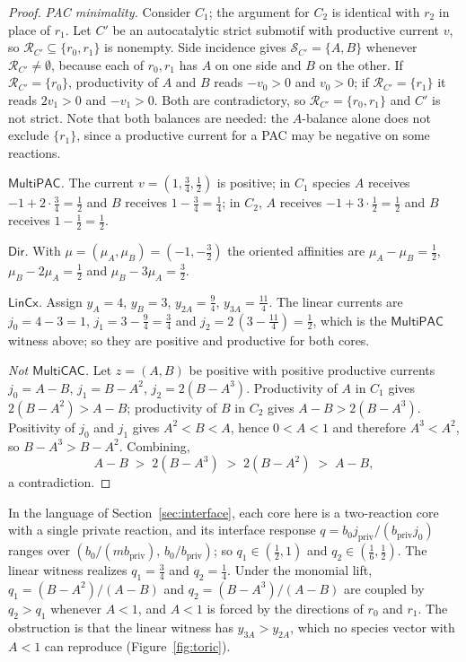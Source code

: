 \documentclass[11pt,a4paper]{article}
\theoremstyle{plain}
\theoremstyle{definition}
\theoremstyle{remark}
\newcommand{\cS}{\mathcal{S}}
\newcommand{\cR}{\mathcal{R}}
\newcommand{\MPAC}{\mathsf{MultiPAC}}
\newcommand{\MCAC}{\mathsf{MultiCAC}}
\newcommand{\DIR}{\mathsf{Dir}}
\newcommand{\LIN}{\mathsf{LinCx}}
\begin{document}
\begin{proof}
\emph{PAC minimality.} Consider $C_1$; the argument for $C_2$ is identical with $r_2$ in place of $r_1$. Let $C'$ be an autocatalytic strict submotif with productive current $v$, so $\cR_{C'}\subseteq\{r_0,r_1\}$ is nonempty. Side incidence gives $\cS_{C'}=\{A,B\}$ whenever $\cR_{C'}\neq\emptyset$, because each of $r_0,r_1$ has $A$ on one side and $B$ on the other. If $\cR_{C'}=\{r_0\}$, productivity of $A$ and $B$ reads $-v_0>0$ and $v_0>0$; if $\cR_{C'}=\{r_1\}$ it reads $2v_1>0$ and $-v_1>0$. Both are contradictory, so $\cR_{C'}=\{r_0,r_1\}$ and $C'$ is not strict. Note that both balances are needed: the $A$-balance alone does not exclude $\{r_1\}$, since a productive current for a PAC may be negative on some reactions.

\emph{$\MPAC$.} The current $v=(1,\tfrac34,\tfrac12)$ is positive; in $C_1$ species $A$ receives $-1+2\cdot\tfrac34=\tfrac12$ and $B$ receives $1-\tfrac34=\tfrac14$; in $C_2$, $A$ receives $-1+3\cdot\tfrac12=\tfrac12$ and $B$ receives $1-\tfrac12=\tfrac12$.

\emph{$\DIR$.} With $\mu=(\mu_A,\mu_B)=(-1,-\tfrac32)$ the oriented affinities are $\mu_A-\mu_B=\tfrac12$, $\mu_B-2\mu_A=\tfrac12$ and $\mu_B-3\mu_A=\tfrac32$.

\emph{$\LIN$.} Assign $y_A=4$, $y_B=3$, $y_{2A}=\tfrac94$, $y_{3A}=\tfrac{11}4$. The linear currents are $j_0=4-3=1$, $j_1=3-\tfrac94=\tfrac34$ and $j_2=2\,(3-\tfrac{11}4)=\tfrac12$, which is the $\MPAC$ witness above; so they are positive and productive for both cores.

\emph{Not $\MCAC$.} Let $z=(A,B)$ be positive with positive productive currents $j_0=A-B$, $j_1=B-A^2$, $j_2=2(B-A^3)$. Productivity of $A$ in $C_1$ gives $2(B-A^2)>A-B$; productivity of $B$ in $C_2$ gives $A-B>2(B-A^3)$. Positivity of $j_0$ and $j_1$ gives $A^2<B<A$, hence $0<A<1$ and therefore $A^3<A^2$, so $B-A^3>B-A^2$. Combining,
\[
  A-B\;>\;2(B-A^3)\;>\;2(B-A^2)\;>\;A-B,
\]
a contradiction.
\end{proof}

In the language of Section~\ref{sec:interface}, each core here is a two-reaction core with a single private reaction, and its interface response $q=b_0j_{\mathrm{priv}}/(b_{\mathrm{priv}}j_0)$ ranges over $(b_0/(mb_{\mathrm{priv}}),\,b_0/b_{\mathrm{priv}})$; so $q_1\in(\tfrac12,1)$ and $q_2\in(\tfrac16,\tfrac12)$. The linear witness realizes $q_1=\tfrac34$ and $q_2=\tfrac14$. Under the monomial lift, $q_1=(B-A^2)/(A-B)$ and $q_2=(B-A^3)/(A-B)$ are coupled by $q_2>q_1$ whenever $A<1$, and $A<1$ is forced by the directions of $r_0$ and $r_1$. The obstruction is that the linear witness has $y_{3A}>y_{2A}$, which no species vector with $A<1$ can reproduce (Figure~\ref{fig:toric}).
\end{document}
